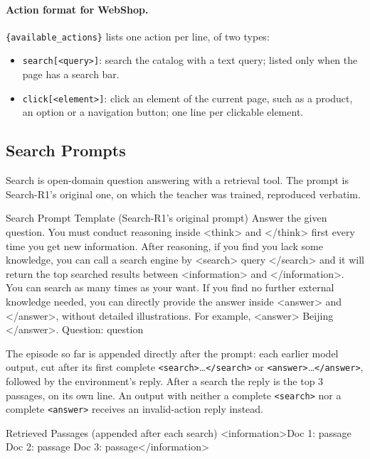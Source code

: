 \paragraph{Action format for WebShop.} \texttt{\{available\_actions\}} lists one action per line, of
two types:
\begin{itemize}
  \item \texttt{search[<query>]}: search the catalog with a text query; listed only when the page has a
    search bar.
  \item \texttt{click[<element>]}: click an element of the current page, such as a product, an option
    or a navigation button; one line per clickable element.
\end{itemize}

\subsection{Search Prompts}
\label{app:prompt-search}

Search is open-domain question answering with a retrieval tool. The prompt is Search-R1's original one,
on which the teacher was trained, reproduced verbatim.

\begin{promptbox}{Search Prompt Template (Search-R1's original prompt)}
Answer the given question. You must conduct reasoning inside <think> and </think> first every time you get new information. After reasoning, if you find you lack some knowledge, you can call a search engine by <search> query </search> and it will return the top searched results between <information> and </information>. You can search as many times as your want. If you find no further external knowledge needed, you can directly provide the answer inside <answer> and </answer>, without detailed illustrations. For example, <answer> Beijing </answer>. Question: {question}
\end{promptbox}

\noindent The episode so far is appended directly after the prompt: each earlier model output, cut after
its first complete \texttt{<search>}\dots\texttt{</search>} or \texttt{<answer>}\dots\texttt{</answer>},
followed by the environment's reply. After a search the reply is the top $3$ passages, on its own line.
An output with neither a complete \texttt{<search>} nor a complete \texttt{<answer>} receives an
invalid-action reply instead.

\begin{promptbox}{Retrieved Passages (appended after each search)}
<information>Doc 1: {passage}
Doc 2: {passage}
Doc 3: {passage}</information>
\end{promptbox}

